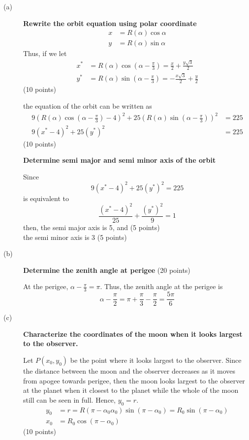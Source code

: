 \begin{description}
\item[(a)] \textbf{Rewrite the orbit equation using polar coordinate}
  \begin{align*}
    x &= R(\alpha)\cos\alpha \\
    y &= R(\alpha)\sin\alpha
  \end{align*}
  Thus, if we let
  \begin{align*}
    x^* &= R(\alpha)\cos\left(\alpha - \frac{\pi}{3}\right)
      = \frac{x}{2} + \frac{y\sqrt{3}}{2} \\
    y^* &= R(\alpha)\sin\left(\alpha - \frac{\pi}{3}\right)
      = -\frac{x\sqrt{3}}{2} + \frac{y}{2}
  \end{align*}
  \hfill(10 points)

  the equation of the orbit can be written as
  \begin{align*}
    9\left(R(\alpha)\cos\left(\alpha - \frac{\pi}{3}\right) - 4\right)^2
      + 25\left(R(\alpha)\sin\left(\alpha - \frac{\pi}{3}\right)\right)^2
      &= 225 \\
    9(x^* - 4)^2 + 25(y^*)^2 &= 225
  \end{align*}
  \hfill(10 points)

  \textbf{Determine semi major and semi minor axis of the orbit}

  Since
  \[
    9(x^* - 4)^2 + 25(y^*)^2 = 225
  \]
  is equivalent to
  \[
    \frac{(x^* - 4)^2}{25} + \frac{(y^*)^2}{9} = 1
  \]
  then, the semi major axis is 5, and \hfill(5 points) \\
  the semi minor axis is 3 \hfill(5 points)

\item[(b)] \textbf{Determine the zenith angle at perigee} \hfill(20 points)

  At the perigee, $\alpha - \frac{\pi}{3} = \pi$. Thus, the zenith angle at
  the perigee is
  \[
    \alpha - \frac{\pi}{2} = \pi + \frac{\pi}{3} - \frac{\pi}{2}
      = \frac{5\pi}{6}
  \]


\item[(c)] \textbf{Characterize the coordinates of the moon when it looks
  largest to the observer.}

  Let $P(x_0, y_0)$ be the point where it looks largest to the observer. Since
  the distance between the moon and the observer decreases as it moves from
  apogee towards perigee, then the moon looks largest to the observer at the
  planet when it closest to the planet while the whole of the moon still can %
  be seen in full. Hence, $y_0 = r$.
  \begin{align*}
    y_0 &= r = R(\pi - \alpha_0\alpha_0)\sin(\pi - \alpha_0)
      = R_0\sin(\pi - \alpha_0) \\ %
    x_0 &= R_0\cos(\pi - \alpha_0)
  \end{align*}
  \hfill(10 points)


\end{description}
